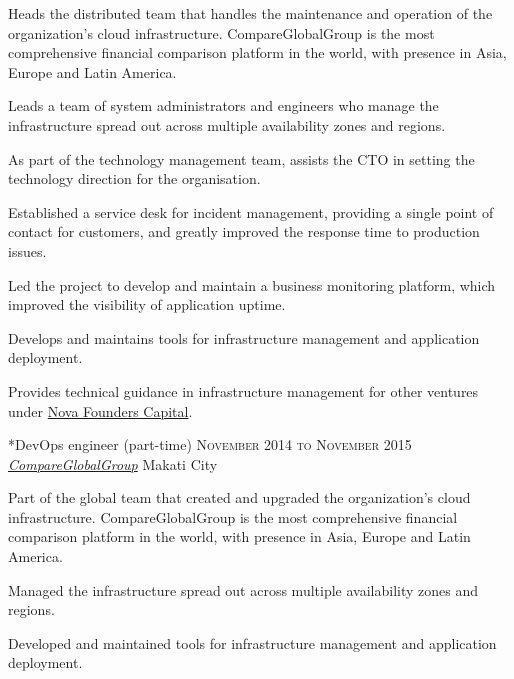\documentclass[10pt, a4paper, final]{article}
\begin{document}
\begin{section}
\begin{subsection}
    Heads the distributed team that handles the maintenance and operation of the organization's cloud infrastructure. CompareGlobalGroup is the most comprehensive financial comparison platform in the world, with presence in Asia, Europe and Latin America.
    \vspace{1em}
    \begin{compactitem}
      \item Leads a team of system administrators and engineers who manage the infrastructure spread out across multiple availability zones and regions.
      \item As part of the technology management team, assists the CTO in setting the technology direction for the organisation.
      \item Established a service desk for incident management, providing a single point of contact for customers, and greatly improved the response time to production issues.
      \item Led the project to develop and maintain a business monitoring platform, which improved the visibility of application uptime.
      \item Develops and maintains tools for infrastructure management and application deployment.
      \item Provides technical guidance in infrastructure management for other ventures under \href{http://www.novafounders.com/}{Nova Founders Capital}.
      
    \end{compactitem}
  \end{subsection}
  \vspace{2.5em}

  \begin{subsection}*{DevOps engineer (part-time) \hfill\textsc{November 2014 to November 2015}}
    \href{http://www.compareglobalgroup.com}{\textit{CompareGlobalGroup}} \hfill Makati City
    \vspace{1em}

    Part of the global team that created and upgraded the organization's cloud infrastructure. CompareGlobalGroup is the most comprehensive financial comparison platform in the world, with presence in Asia, Europe and Latin America.
    \vspace{1em}
    \begin{compactitem}
      \item Managed the infrastructure spread out across multiple availability zones and regions.
      \item Developed and maintained tools for infrastructure management and application deployment.
      

\end{compactitem}
\end{subsection}
\end{section}
\end{document}
